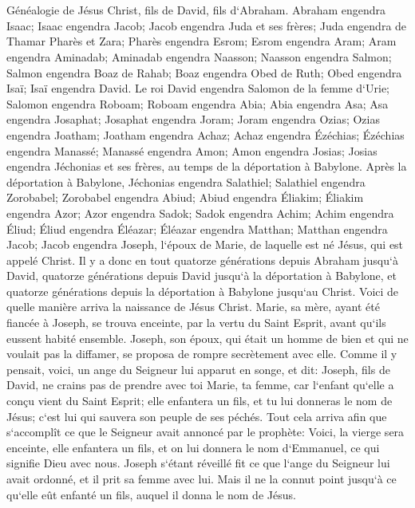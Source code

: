 

\chapter{}

\verse Généalogie de Jésus Christ, fils de David, fils d`Abraham. 
\verse Abraham engendra Isaac; Isaac engendra Jacob; Jacob engendra Juda et ses frères; 
\verse Juda engendra de Thamar Pharès et Zara; Pharès engendra Esrom; Esrom engendra Aram; 
\verse Aram engendra Aminadab; Aminadab engendra Naasson; Naasson engendra Salmon; 
\verse Salmon engendra Boaz de Rahab; Boaz engendra Obed de Ruth; 
\verse Obed engendra Isaï; Isaï engendra David. Le roi David engendra Salomon de la femme d`Urie; 
\verse Salomon engendra Roboam; Roboam engendra Abia; Abia engendra Asa; 
\verse Asa engendra Josaphat; Josaphat engendra Joram; Joram engendra Ozias; 
\verse Ozias engendra Joatham; Joatham engendra Achaz; Achaz engendra Ézéchias; 
\verse Ézéchias engendra Manassé; Manassé engendra Amon; Amon engendra Josias; 
\verse Josias engendra Jéchonias et ses frères, au temps de la déportation à Babylone. 
\verse Après la déportation à Babylone, Jéchonias engendra Salathiel; Salathiel engendra Zorobabel; 
\verse Zorobabel engendra Abiud; Abiud engendra Éliakim; Éliakim engendra Azor; 
\verse Azor engendra Sadok; Sadok engendra Achim; Achim engendra Éliud; 
\verse Éliud engendra Éléazar; Éléazar engendra Matthan; Matthan engendra Jacob; 
\verse Jacob engendra Joseph, l`époux de Marie, de laquelle est né Jésus, qui est appelé Christ. 
\verse Il y a donc en tout quatorze générations depuis Abraham jusqu`à David, quatorze générations depuis David jusqu`à la déportation à Babylone, et quatorze générations depuis la déportation à Babylone jusqu`au Christ. 
\verse Voici de quelle manière arriva la naissance de Jésus Christ. Marie, sa mère, ayant été fiancée à Joseph, se trouva enceinte, par la vertu du Saint Esprit, avant qu`ils eussent habité ensemble. 
\verse Joseph, son époux, qui était un homme de bien et qui ne voulait pas la diffamer, se proposa de rompre secrètement avec elle. 
\verse Comme il y pensait, voici, un ange du Seigneur lui apparut en songe, et dit: Joseph, fils de David, ne crains pas de prendre avec toi Marie, ta femme, car l`enfant qu`elle a conçu vient du Saint Esprit; 
\verse elle enfantera un fils, et tu lui donneras le nom de Jésus; c`est lui qui sauvera son peuple de ses péchés. 
\verse Tout cela arriva afin que s`accomplît ce que le Seigneur avait annoncé par le prophète: 
\verse Voici, la vierge sera enceinte, elle enfantera un fils, et on lui donnera le nom d`Emmanuel, ce qui signifie Dieu avec nous. 
\verse Joseph s`étant réveillé fit ce que l`ange du Seigneur lui avait ordonné, et il prit sa femme avec lui. 
\verse Mais il ne la connut point jusqu`à ce qu`elle eût enfanté un fils, auquel il donna le nom de Jésus. 

